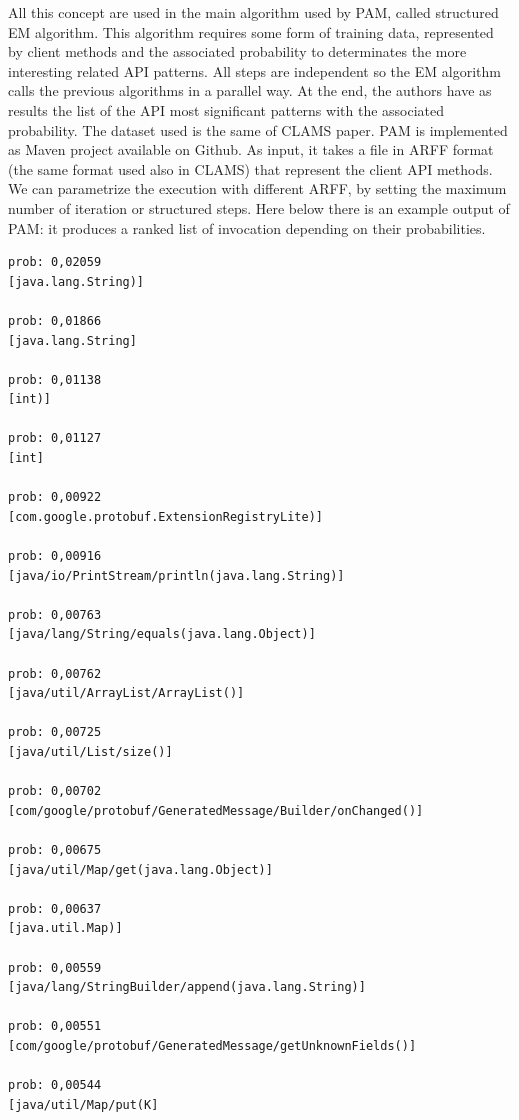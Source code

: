 All this concept are used in the main algorithm used by PAM, called structured EM algorithm. This algorithm requires some form of training data, represented by client methods and the associated probability to determinates the more interesting related API patterns. All steps are independent so the EM algorithm calls the previous algorithms in a parallel way. At the end, the authors have as results the list of the API most significant patterns with the associated probability. The dataset used is the same of CLAMS paper. PAM is implemented as Maven project available on Github. As input, it takes a file in ARFF format (the same format used also in CLAMS) that represent the client API methods. We can parametrize the execution with different ARFF, by setting the maximum number of iteration or structured steps. Here below there is an example output of PAM: it produces a ranked list of invocation depending on their probabilities. 

\begin{lstlisting}
prob: 0,02059
[java.lang.String)]

prob: 0,01866
[java.lang.String]

prob: 0,01138
[int)]

prob: 0,01127
[int]

prob: 0,00922
[com.google.protobuf.ExtensionRegistryLite)]

prob: 0,00916
[java/io/PrintStream/println(java.lang.String)]

prob: 0,00763
[java/lang/String/equals(java.lang.Object)]

prob: 0,00762
[java/util/ArrayList/ArrayList()]

prob: 0,00725
[java/util/List/size()]

prob: 0,00702
[com/google/protobuf/GeneratedMessage/Builder/onChanged()]

prob: 0,00675
[java/util/Map/get(java.lang.Object)]

prob: 0,00637
[java.util.Map)]

prob: 0,00559
[java/lang/StringBuilder/append(java.lang.String)]

prob: 0,00551
[com/google/protobuf/GeneratedMessage/getUnknownFields()]

prob: 0,00544
[java/util/Map/put(K]

\end{lstlisting}

